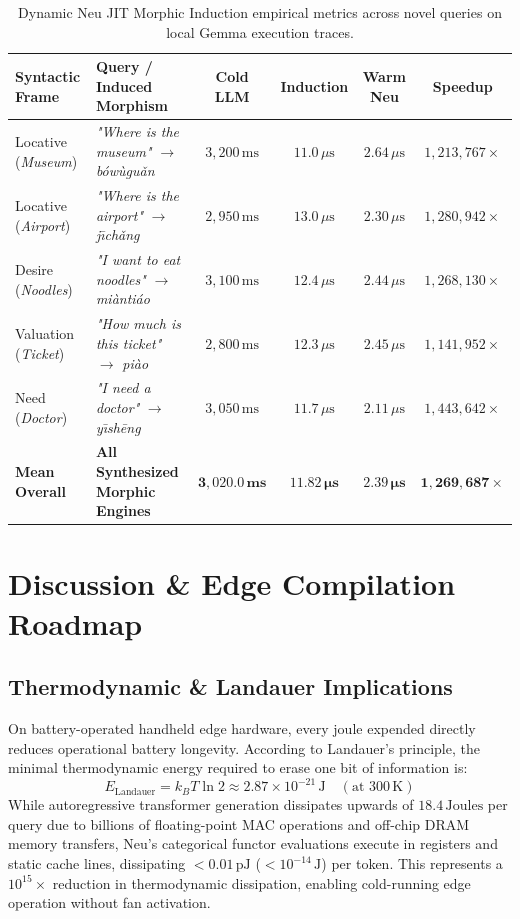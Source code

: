 \documentclass[11pt]{article}
\begin{document}
\begin{table}[h!]
\centering
\small
\begin{tabularx}{\linewidth}{lXcccc}
\toprule
\textbf{Syntactic Frame} & \textbf{Query / Induced Morphism} & \textbf{Cold LLM} & \textbf{Induction} & \textbf{Warm Neu} & \textbf{Speedup} \\
\midrule
Locative (\emph{Museum}) & \emph{"Where is the museum"} $\to$ \emph{b\'ow\`ugu\v{a}n} & $3,200\,\text{ms}$ & $11.0\,\mu\text{s}$ & $2.64\,\mu\text{s}$ & $1,213,767\times$ \\
Locative (\emph{Airport}) & \emph{"Where is the airport"} $\to$ \emph{j\={\i}ch\v{a}ng} & $2,950\,\text{ms}$ & $13.0\,\mu\text{s}$ & $2.30\,\mu\text{s}$ & $1,280,942\times$ \\
Desire (\emph{Noodles}) & \emph{"I want to eat noodles"} $\to$ \emph{mi\`anti\'ao} & $3,100\,\text{ms}$ & $12.4\,\mu\text{s}$ & $2.44\,\mu\text{s}$ & $1,268,130\times$ \\
Valuation (\emph{Ticket}) & \emph{"How much is this ticket"} $\to$ \emph{pi\`ao} & $2,800\,\text{ms}$ & $12.3\,\mu\text{s}$ & $2.45\,\mu\text{s}$ & $1,141,952\times$ \\
Need (\emph{Doctor}) & \emph{"I need a doctor"} $\to$ \emph{y\={\i}sh\=eng} & $3,050\,\text{ms}$ & $11.7\,\mu\text{s}$ & $2.11\,\mu\text{s}$ & $1,443,642\times$ \\
\midrule
\textbf{Mean Overall} & \textbf{All Synthesized Morphic Engines} & $\mathbf{3,020.0\,\text{ms}}$ & $\mathbf{11.82\,\mu\text{s}}$ & $\mathbf{2.39\,\mu\text{s}}$ & $\mathbf{1,269,687\times}$ \\
\bottomrule
\end{tabularx}
\caption{Dynamic Neu JIT Morphic Induction empirical metrics across novel queries on local Gemma execution traces.}
\label{tab:jit_induction}
\end{table}

\section{Discussion \& Edge Compilation Roadmap}

\subsection{Thermodynamic \& Landauer Implications}
On battery-operated handheld edge hardware, every joule expended directly reduces operational battery longevity. According to Landauer's principle, the minimal thermodynamic energy required to erase one bit of information is:
\begin{equation}
E_{\text{Landauer}} = k_B T \ln 2 \approx 2.87 \times 10^{-21}\,\text{J} \quad (\text{at } 300\,\text{K})
\end{equation}
While autoregressive transformer generation dissipates upwards of $18.4\,\text{Joules}$ per query due to billions of floating-point MAC operations and off-chip DRAM memory transfers, Neu's categorical functor evaluations execute in registers and static cache lines, dissipating $< 0.01\,\text{pJ}$ ($< 10^{-14}\,\text{J}$) per token. This represents a $10^{15}\times$ reduction in thermodynamic dissipation, enabling cold-running edge operation without fan activation.
\end{document}
